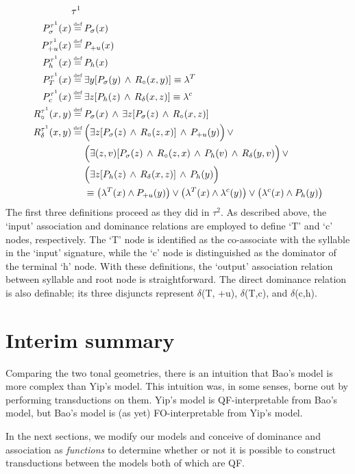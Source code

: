 \documentclass{article}
\newcommand\myeq{\mathrel{\stackrel{\makebox[0pt]{\mbox{\normalfont\tiny def}}}{=}}}
\begin{document}
\begin{equation} 
\begin{split}
&\tau^1 \\
P^{\tau^1}_{\sigma}(x) &\myeq P_{\sigma}(x) \\
P^{\tau^1}_{+u}(x) &\myeq P_{+u}(x) \\
P^{\tau^1}_{h}(x) &\myeq P_{h}(x) \\
P^{\tau^1}_{T}(x) &\myeq \exists y[P_{\sigma}(y)\,\wedge\,R_{\circ}(x,y)] \equiv \lambda^{T} \\
P^{\tau^1}_{c}(x) &\myeq \exists z[P_{h}(z)\,\wedge\,R_{\delta}(x,z)] \equiv \lambda^{c} \\
R^{\tau^1}_{\circ}(x,y) &\myeq P_{\sigma}(x)\,\wedge\,\exists z[P_{\sigma}(z)\,\wedge\,R_{\circ}(x,z)] \\
R^{\tau^1}_{\delta}(x,y) &\myeq \Big(\exists z[P_{\sigma}(z)\,\wedge\,R_{\circ}(z,x)]\,\wedge\,P_{+u}(y)\Big)\,\lor \\
&\ \ \ \ \Big(\exists(z,v)[P_{\sigma}(z)\,\wedge\,R_{\circ}(z,x)\,\wedge\,P_{h}(v)\,\wedge\,R_{\delta}(y,v)\Big)\,\lor \\
&\ \ \ \ \Big(\exists z[P_{h}(z)\,\wedge\,R_{\delta}(x,z)]\,\wedge\,P_{h}(y)\Big) \\
&\ \ \ \ \equiv \big(\lambda^{T}(x)\wedge P_{+u}(y)\big)\lor\big(\lambda^{T}(x)\wedge\lambda^{c}(y)\big)\lor\big(\lambda^{c}(x)\wedge P_{h}(y)\big)
\end{split}
\end{equation}
The first three definitions proceed as they did in $\tau^2$. As described above, the `input' association and dominance relations are employed to define `T' and `c' nodes, respectively. The `T' node is identified as the co-associate with the syllable in the `input' signature, while the `c' node is distinguished as the dominator of the terminal `h' node. With these definitions, the `output' association relation between syllable and root node is straightforward. The direct dominance relation is also definable; its three disjuncts represent $\delta$(T, +u), $\delta$(T,c), and $\delta$(c,h).
\section{Interim summary}
Comparing the two tonal geometries, there is an intuition that Bao's model is more complex than Yip's model. This intuition was, in some senses, borne out by performing transductions on them. Yip's model is QF-interpretable from Bao's model, but Bao's model is (as yet) FO-interpretable from Yip's model. \par
In the next sections, we modify our models and conceive of dominance and association as \emph{functions} to determine whether or not it is possible to construct transductions between the models both of which are QF.
\end{document}
